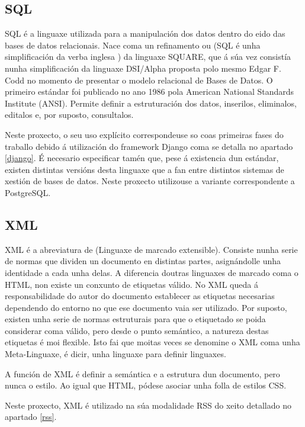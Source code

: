 \subsection{SQL}

SQL é a linguaxe utilizada para a manipulación dos datos dentro do eido das bases de datos relacionais. Nace coma un refinamento ou  (SQL é unha simplificación da verba inglesa ) da linguaxe SQUARE, que á súa vez consistía nunha simplificación da linguaxe DSI/Alpha proposta polo mesmo Edgar F. Codd no momento de presentar o modelo relacional de Bases de Datos. O primeiro estándar foi publicado no ano 1986 pola American National Standards Institute (ANSI)\cite{sql1}. Permite definir a estruturación dos datos, inserilos, eliminalos, editalos e, por suposto, consultalos.

Neste proxecto, o seu uso explícito correspondeuse so coas primeiras fases do traballo debido á utilización do framework Django coma se detalla no apartado \ref{django}. É necesario especificar tamén que, pese á existencia dun estándar, existen distintas versións desta linguaxe que a fan  entre distintos sistemas de xestión de bases de datos\cite{sql2}. Neste proxecto utilizouse a variante correspondente a PostgreSQL.


\subsection{XML}

XML é a abreviatura de  (Linguaxe de marcado extensible). Consiste nunha serie de normas que dividen un documento en distintas partes, asignándolle unha identidade a cada unha delas. A diferencia doutras linguaxes de marcado coma o HTML, non existe un conxunto de etiquetas válido. No XML queda á responsabilidade do autor do documento establecer as etiquetas necesarias dependendo do entorno no que ese documento vaia ser utilizado. Por suposto, existen unha serie de normas estruturais para que o etiquetado se poida considerar coma válido, pero desde o punto semántico, a natureza destas etiquetas é moi flexible. Isto fai que moitas veces se denomine o XML coma unha Meta-Linguaxe, é dicir, unha linguaxe para definir linguaxes\cite{xml1}.

A función de XML é definir a semántica e a estrutura dun documento, pero nunca o estilo. Ao igual que HTML, pódese asociar unha folla de estilos CSS.

Neste proxecto, XML é utilizado na súa modalidade RSS do xeito detallado no apartado \ref{rss}.

